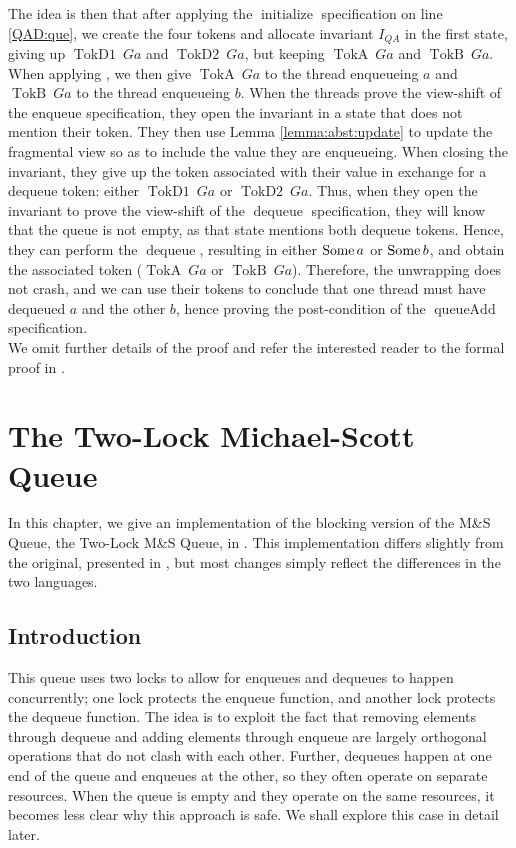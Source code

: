 \documentclass[a4paper, 10pt]{report}
\theoremstyle{definition}
\newcommand{\initialise}{\operatorname{initialize}}
\newcommand{\dequeue}{\operatorname{dequeue}}
\newcommand{\queueAdd}{\operatorname{queueAdd}}
\newcommand{\msq}{M\&S Queue}
\newcommand{\tlmsq}{Two-Lock \msq{}}
\newcommand{\QueueAddInvariant}{I_{QA}}
\newcommand{\QAg}{Ga}
\newcommand{\TokDo}[1]{\operatorname{TokD1} ~ #1}
\newcommand{\TokDoQAg}{\TokDo{\QAg}}
\newcommand{\TokDt}[1]{\operatorname{TokD2} ~ #1}
\newcommand{\TokDtQAg}{\TokDt{\QAg}}
\newcommand{\TokA}[1]{\operatorname{TokA} ~ #1}
\newcommand{\TokAQAg}{\TokA{\QAg}}
\newcommand{\TokB}[1]{\operatorname{TokB} ~ #1}
\newcommand{\TokBQAg}{\TokB{\QAg}}
\begin{document}
The idea is then that after applying the $\initialise$ specification on line \ref{QAD:que}, we create the four tokens and allocate invariant $\QueueAddInvariant$ in the first state, giving up $\TokDoQAg$ and $\TokDtQAg$, but keeping $\TokAQAg$ and $\TokBQAg$. When applying , we then give $\TokAQAg$ to the thread enqueueing $a$ and $\TokBQAg$ to the thread enqueueing $b$. When the threads prove the view-shift of the enqueue specification, they open the invariant in a state that does not mention their token. They then use Lemma \ref{lemma:abst:update} to update the fragmental view so as to include the value they are enqueueing. When closing the invariant, they give up the token associated with their value in exchange for a dequeue token: either $\TokDoQAg$ or $\TokDtQAg$. Thus, when they open the invariant to prove the view-shift of the $\dequeue$ specification, they will know that the queue is not empty, as that state mentions both dequeue tokens. Hence, they can perform the $\dequeue$, resulting in either $\operatorname{Some} a$ or $\operatorname{Some} b$, and obtain the associated token ($\TokAQAg$ or $\TokBQAg$). Therefore, the unwrapping does not crash, and we can use their tokens to conclude that one thread must have dequeued $a$ and the other $b$, hence proving the post-condition of the $\queueAdd$ specification.\\
We omit further details of the proof and refer the interested reader to the formal proof in .


\chapter{The Two-Lock Michael-Scott Queue}
\label{ch:TLMSQ}

In this chapter, we give an implementation of the blocking version of the \msq{}, the \tlmsq{}, in \heaplang. This implementation differs slightly from the original, presented in \citet{DBLP:conf/podc/MichaelS96}, but most changes simply reflect the differences in the two languages.

\section{Introduction}
\label{TLMSQ:section:introduction}

This queue uses two locks to allow for enqueues and dequeues to happen concurrently; one lock protects the enqueue function, and another lock protects the dequeue function. The idea is to exploit the fact that removing elements through dequeue and adding elements through enqueue are largely orthogonal operations that do not clash with each other. Further, dequeues happen at one end of the queue and enqueues at the other, so they often operate on separate resources. When the queue is empty and they operate on the same resources, it becomes less clear why this approach is safe. We shall explore this case in detail later.
\end{document}
